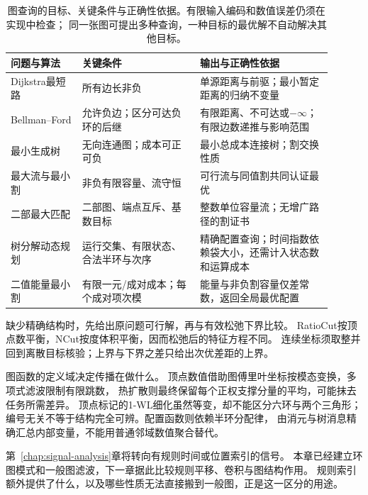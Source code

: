 \begin{table}[htbp]
  \centering
  \caption{图查询的目标、关键条件与正确性依据。有限输入编码和数值误差仍须在实现中检查；
  同一张图可提出多种查询，一种目标的最优解不自动解决其他目标。}
  \label{tab:graph-algorithm-conditions}
  \begin{tabular}{p{0.20\linewidth}p{0.33\linewidth}p{0.37\linewidth}}
    \toprule
    问题与算法 & 关键条件 & 输出与正确性依据\\
    \midrule
    Dijkstra最短路 & 所有边长非负 & 单源距离与前驱；最小暂定距离的归纳不变量\\
    Bellman--Ford & 允许负边；区分可达负环的后继 & 有限距离、不可达或\(-\infty\)；
      有限边数递推与影响范围\\
    最小生成树 & 无向连通图；成本可正可负 & 最小总成本连接树；割交换性质\\
    最大流与最小割 & 非负有限容量、流守恒 & 可行流与同值割共同认证最优\\
    二部最大匹配 & 二部图、端点互斥、基数目标 & 整数单位容量流；无增广路径的割证书\\
    树分解动态规划 & 运行交集、有限状态、合法半环与次序 &
      精确配置查询；时间指数依赖袋大小，还需计入状态数和运算成本\\
    二值能量最小割 & 有限一元/成对成本；每个成对项次模 &
      能量与非负割容量仅差常数，返回全局最优配置\\
    \bottomrule
  \end{tabular}
\end{table}

缺少精确结构时，先给出原问题可行解，再与有效松弛下界比较。
RatioCut按顶点数平衡，NCut按度体积平衡，因而松弛后的特征方程不同。
连续坐标须取整并回到离散目标核验；上界与下界之差只给出次优差距的上界。

图函数的定义域决定传播在做什么。
顶点数值借助图傅里叶坐标按模态变换，多项式滤波限制有限跳数，
热扩散则最终保留每个正权支撑分量的平均，可能抹去任务所需差异。
顶点标记的1-WL细化虽然等变，却不能区分六环与两个三角形；
编号无关不等于结构完全可辨。配置函数则依赖半环分配律，
由消元与树消息精确汇总内部变量，不能用普通邻域数值聚合替代。

第~\ref{chap:signal-analysis}章将转向有规则时间或位置索引的信号。
本章已经建立环图模式和一般图滤波，下一章据此比较规则平移、卷积与图结构作用。
规则索引额外提供了什么，以及哪些性质无法直接搬到一般图，正是这一区分的用途。
